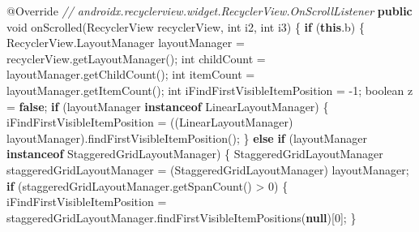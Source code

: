 \documentclass[
]{article}
\newenvironment{Shaded}{}{}
\newcommand{\AttributeTok}[1]{\textcolor[rgb]{0.49,0.56,0.16}{#1}}
\newcommand{\CommentTok}[1]{\textcolor[rgb]{0.38,0.63,0.69}{\textit{#1}}}
\newcommand{\ControlFlowTok}[1]{\textcolor[rgb]{0.00,0.44,0.13}{\textbf{#1}}}
\newcommand{\DataTypeTok}[1]{\textcolor[rgb]{0.56,0.13,0.00}{#1}}
\newcommand{\DecValTok}[1]{\textcolor[rgb]{0.25,0.63,0.44}{#1}}
\newcommand{\FunctionTok}[1]{\textcolor[rgb]{0.02,0.16,0.49}{#1}}
\newcommand{\KeywordTok}[1]{\textcolor[rgb]{0.00,0.44,0.13}{\textbf{#1}}}
\newcommand{\NormalTok}[1]{#1}
\newcommand{\OperatorTok}[1]{\textcolor[rgb]{0.40,0.40,0.40}{#1}}
\begin{document}
\begin{Shaded}
\begin{Highlighting}[]
        \AttributeTok{@Override} \CommentTok{// androidx.recyclerview.widget.RecyclerView.OnScrollListener}
        \KeywordTok{public} \DataTypeTok{void} \FunctionTok{onScrolled}\OperatorTok{(}\NormalTok{RecyclerView recyclerView}\OperatorTok{,} \DataTypeTok{int}\NormalTok{ i2}\OperatorTok{,} \DataTypeTok{int}\NormalTok{ i3}\OperatorTok{)} \OperatorTok{\{}
            \ControlFlowTok{if} \OperatorTok{(}\KeywordTok{this}\OperatorTok{.}\FunctionTok{b}\OperatorTok{)} \OperatorTok{\{}
\NormalTok{                RecyclerView}\OperatorTok{.}\FunctionTok{LayoutManager}\NormalTok{ layoutManager }\OperatorTok{=}\NormalTok{ recyclerView}\OperatorTok{.}\FunctionTok{getLayoutManager}\OperatorTok{();}
                \DataTypeTok{int}\NormalTok{ childCount }\OperatorTok{=}\NormalTok{ layoutManager}\OperatorTok{.}\FunctionTok{getChildCount}\OperatorTok{();}
                \DataTypeTok{int}\NormalTok{ itemCount }\OperatorTok{=}\NormalTok{ layoutManager}\OperatorTok{.}\FunctionTok{getItemCount}\OperatorTok{();}
                \DataTypeTok{int}\NormalTok{ iFindFirstVisibleItemPosition }\OperatorTok{=} \OperatorTok{{-}}\DecValTok{1}\OperatorTok{;}
                \DataTypeTok{boolean}\NormalTok{ z }\OperatorTok{=} \KeywordTok{false}\OperatorTok{;}
                \ControlFlowTok{if} \OperatorTok{(}\NormalTok{layoutManager }\KeywordTok{instanceof}\NormalTok{ LinearLayoutManager}\OperatorTok{)} \OperatorTok{\{}
\NormalTok{                    iFindFirstVisibleItemPosition }\OperatorTok{=} \OperatorTok{((}\NormalTok{LinearLayoutManager}\OperatorTok{)}\NormalTok{ layoutManager}\OperatorTok{).}\FunctionTok{findFirstVisibleItemPosition}\OperatorTok{();}
                \OperatorTok{\}} \ControlFlowTok{else} \ControlFlowTok{if} \OperatorTok{(}\NormalTok{layoutManager }\KeywordTok{instanceof}\NormalTok{ StaggeredGridLayoutManager}\OperatorTok{)} \OperatorTok{\{}
\NormalTok{                    StaggeredGridLayoutManager staggeredGridLayoutManager }\OperatorTok{=} \OperatorTok{(}\NormalTok{StaggeredGridLayoutManager}\OperatorTok{)}\NormalTok{ layoutManager}\OperatorTok{;}
                    \ControlFlowTok{if} \OperatorTok{(}\NormalTok{staggeredGridLayoutManager}\OperatorTok{.}\FunctionTok{getSpanCount}\OperatorTok{()} \OperatorTok{\textgreater{}} \DecValTok{0}\OperatorTok{)} \OperatorTok{\{}
\NormalTok{                        iFindFirstVisibleItemPosition }\OperatorTok{=}\NormalTok{ staggeredGridLayoutManager}\OperatorTok{.}\FunctionTok{findFirstVisibleItemPositions}\OperatorTok{(}\KeywordTok{null}\OperatorTok{)[}\DecValTok{0}\OperatorTok{];}
                    \OperatorTok{\}}

\end{Highlighting}
\end{Shaded}
\end{document}
